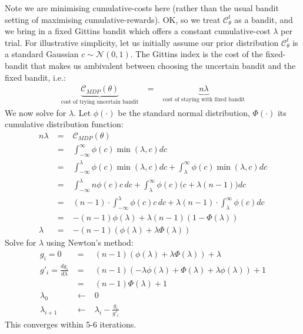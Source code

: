 \documentclass[a4paper,10pt]{article}
\newcommand{\pdf}{\phi(\lambda)}
\newcommand{\cdf}{\Phi(\lambda)}
\newcommand{\sqb}[1]{\begin{bmatrix}#1\end{bmatrix}}
\newcommand{\C}{\mathcal{C}}
\newcommand{\N}{\mathcal{N}}
\begin{document}
Note we are minimising cumulative-costs here
(rather than the usual bandit setting of maximising cumulative-rewards).
OK, so we treat $\C^t_\theta$ as a bandit, and we bring in a fixed Gittins bandit which 
offers a constant cumulative-cost $\lambda$ per trial. 
For illustrative simplicity, let us initially assume our prior distribution $\C^t_\theta$ is a standard Gaussian $c \sim \N(0,1)$. The 
Gittins index is the cost of the fixed-bandit that makes us ambivalent between 
choosing the uncertain bandit and the fixed bandit, i.e.:
%
\begin{eqnarray}
  \underbrace{\C_{MDP}(\theta)}_{\text{cost of trying uncertain bandit}} 
&\;=\;& \underbrace{n\lambda}_{\text{cost of staying with fixed bandit}}
\end{eqnarray}
%
We now solve for $\lambda$. Let $\phi(\cdot)$ be the standard normal 
distribution, $\Phi(\cdot)$ its cumulative distribution function:
%
\begin{eqnarray}
 n\lambda 
 &\;=\;& \C_{MDP}(\theta) \\
 &\;=\;& \int_{-\infty}^{\infty} \phi(c)\min(\lambda,c)dc\\
 &\;=\;& \int_{-\infty}^{\lambda} \phi(c)\min(\lambda,c)dc + \int_{\lambda}^{\infty} \phi(c)\min(\lambda,c)dc\\
 &\;=\;& \int_{-\infty}^{\lambda} n\phi(c)c \, dc          + \int_{\lambda}^{\infty} \phi(c) \big( c + \lambda(n-1) \big) dc \\
 &\;=\;& (n-1)\cdot\int_{-\infty}^{\lambda} \phi(c)c \, dc          + \lambda(n-1)\cdot\int_{\lambda}^{\infty} \phi(c) dc \\
 &\;=\;& -(n-1)\pdf + \lambda(n-1)(1-\cdf) \\
 \lambda &\;=\;& -(n-1)(\pdf+\lambda\cdf)
\end{eqnarray} 
%
Solve for $\lambda$ using Newton's method:
%
\begin{eqnarray}
 g_i =0 &\;=\;& (n-1)(\pdf +\lambda\cdf) + \lambda \\
 g'_i = \frac{dg_i}{d\lambda} &\;=\;& (n-1)(-\lambda\pdf +\cdf +\lambda\pdf) + 1 \\
                     &\;=\;& (n-1)\cdf + 1 \\
 \lambda_0 &\;\leftarrow\;& 0 \\
 \lambda_{i+1} &\;\leftarrow\;& \lambda_i - \frac{g_i}{g'_i}
\end{eqnarray}
%
This converges within 5-6 iterations.
\end{document}
